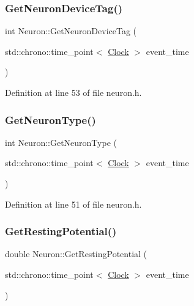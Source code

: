 \subsubsection{\texorpdfstring{Get\+Neuron\+Device\+Tag()}{GetNeuronDeviceTag()}}
{\footnotesize\ttfamily int Neuron\+::\+Get\+Neuron\+Device\+Tag (\begin{DoxyParamCaption}\item[{std\+::chrono\+::time\+\_\+point$<$ \hyperlink{universe_8h_a0ef8d951d1ca5ab3cfaf7ab4c7a6fd80}{Clock} $>$}]{event\+\_\+time }\end{DoxyParamCaption})\hspace{0.3cm}{\ttfamily [inline]}}



Definition at line 53 of file neuron.\+h.

\mbox{\label{class_neuron_a98f326ea86e6e8371b639609a4495c37}} 
\subsubsection{\texorpdfstring{Get\+Neuron\+Type()}{GetNeuronType()}}
{\footnotesize\ttfamily int Neuron\+::\+Get\+Neuron\+Type (\begin{DoxyParamCaption}\item[{std\+::chrono\+::time\+\_\+point$<$ \hyperlink{universe_8h_a0ef8d951d1ca5ab3cfaf7ab4c7a6fd80}{Clock} $>$}]{event\+\_\+time }\end{DoxyParamCaption})\hspace{0.3cm}{\ttfamily [inline]}}



Definition at line 51 of file neuron.\+h.

\mbox{\label{class_neuron_a0573244d3c78a22a45c249db536cbb68}} 
\subsubsection{\texorpdfstring{Get\+Resting\+Potential()}{GetRestingPotential()}}
{\footnotesize\ttfamily double Neuron\+::\+Get\+Resting\+Potential (\begin{DoxyParamCaption}\item[{std\+::chrono\+::time\+\_\+point$<$ \hyperlink{universe_8h_a0ef8d951d1ca5ab3cfaf7ab4c7a6fd80}{Clock} $>$}]{event\+\_\+time }\end{DoxyParamCaption})\hspace{0.3cm}{\ttfamily [inline]}}



